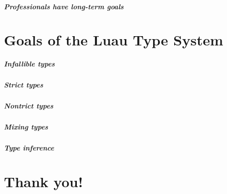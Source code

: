 \documentclass[aspectratio=169]{beamer}
\begin{document}
\begin{frame}

\frametitle{Professionals have long-term goals}

\end{frame}

\part{Goals of the Luau Type System}

\begin{frame}

\frametitle{Infallible types}

\end{frame}

\begin{frame}

\frametitle{Strict types}

\end{frame}

\begin{frame}

\frametitle{Nontrict types}

\end{frame}

\begin{frame}

\frametitle{Mixing types}

\end{frame}

\begin{frame}

\frametitle{Type inference}

\end{frame}

\part{Thank you!}
\end{document}
